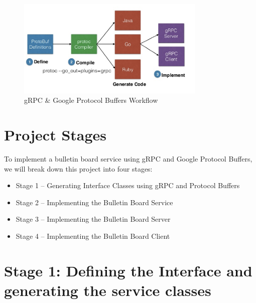 \documentclass{article}
\begin{document}

\begin{figure}[h]
\includegraphics[width=9cm]{images/gRPCWorkflow}
\centering
\caption{gRPC \& Google Protocol Buffers Workflow}
\end{figure}



\section{Project Stages} %

To implement a bulletin board service using gRPC and Google Protocol Buffers, we will break down this project into four stages:
\begin{itemize}  
\item Stage 1 – Generating Interface Classes using gRPC and Protocol Buffers
\item Stage 2 – Implementing the Bulletin Board Service
\item Stage 3 – Implementing the Bulletin Board Server
\item Stage 4 – Implementing the Bulletin Board Client 
\end{itemize}




\section{Stage 1: Defining the Interface and generating the service classes} %
\end{document}
